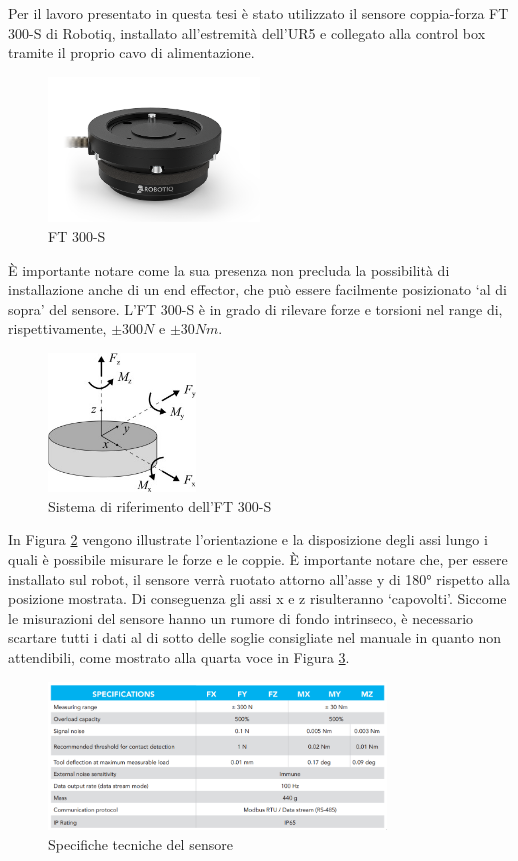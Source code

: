 Per il lavoro presentato in questa tesi è stato utilizzato il sensore coppia-forza FT 300-S di Robotiq, installato all'estremit\`{a} 
dell'UR5 e collegato alla control box tramite il proprio cavo di alimentazione. 
\begin{figure}[H]
    \centering
    \includegraphics*[width=0.5\textwidth]{images/ft.png}
    \caption{FT 300-S}
    \label{fig:ft}
\end{figure}
\`{E} importante notare come la sua presenza non precluda la possibilit\`{a} di installazione anche di un end effector, 
che pu\`{o} essere facilmente posizionato `al di sopra' del sensore. 
L'FT 300-S \`{e} in grado di rilevare forze e torsioni nel range di, rispettivamente, $\pm 300 N$ e $\pm 30 Nm$. 
\begin{figure}[H]
    \centering
    \includegraphics*[width=0.35\textwidth]{images/ft_axes.jpg}
    \caption{Sistema di riferimento dell'FT 300-S}
    \label{fig:ft_axes}
\end{figure}
In Figura \ref{fig:ft_axes} vengono illustrate l'orientazione e la disposizione degli assi lungo i quali \`{e} possibile misurare le 
forze e le coppie. \`{E} importante notare che, per essere installato sul robot, il sensore verr\`{a} ruotato attorno all'asse y di 180° 
rispetto alla posizione mostrata. Di conseguenza gli assi x e z risulteranno `capovolti'.
Siccome le misurazioni del sensore hanno un rumore di fondo intrinseco, \`{e} necessario scartare tutti i dati al di sotto delle 
soglie consigliate nel manuale \cite{ft_sensor} in quanto non attendibili, come mostrato alla quarta voce in Figura \ref{fig:data_sheet}.
\begin{figure}[H]
    \centering
    \includegraphics*[width=0.8\textwidth]{images/data_sheet.png}
    \caption{Specifiche tecniche del sensore}
    \label{fig:data_sheet}
\end{figure}
